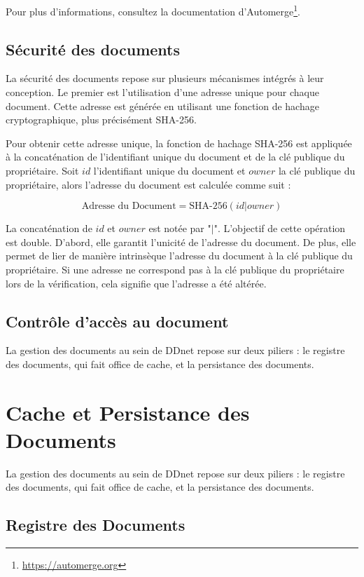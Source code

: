 Pour plus d'informations, consultez la documentation d'Automerge\footnote{\url{https://automerge.org}}.


\subsection{Sécurité des documents}

La sécurité des documents repose sur plusieurs mécanismes intégrés à leur conception. Le premier est l'utilisation d'une adresse unique pour chaque document. Cette adresse est générée en utilisant une fonction de hachage cryptographique, plus précisément SHA-256.

Pour obtenir cette adresse unique, la fonction de hachage SHA-256 est appliquée à la concaténation de l'identifiant unique du document et de la clé publique du propriétaire. Soit $id$ l'identifiant unique du document et $owner$ la clé publique du propriétaire, alors l'adresse du document est calculée comme suit :

\begin{equation}
  \text{Adresse du Document} = \text{SHA-256}(id | owner)
\end{equation}

La concaténation de $id$ et $owner$ est notée par "$|$". L'objectif de cette opération est double. D'abord, elle garantit l'unicité de l'adresse du document. De plus, elle permet de lier de manière intrinsèque l'adresse du document à la clé publique du propriétaire. Si une adresse ne correspond pas à la clé publique du propriétaire lors de la vérification, cela signifie que l'adresse a été altérée.

\subsection{Contrôle d'accès au document}

La gestion des documents au sein de DDnet repose sur deux piliers : le registre des documents, qui fait office de cache, et la persistance des documents.

\section{Cache et Persistance des Documents}

La gestion des documents au sein de DDnet repose sur deux piliers : le registre des documents, qui fait office de cache, et la persistance des documents.

\subsection{Registre des Documents}

